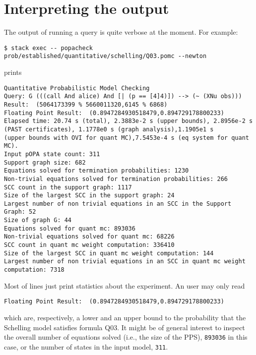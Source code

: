 \documentclass[9pt,a4paper]{article}
\begin{document}
\section{Interpreting the output}
\label{sec:output}
The output of running a query is quite verbose at the moment. For example: 
\begin{verbatim}
$ stack exec -- popacheck prob/established/quantitative/schelling/Q03.pomc --newton
\end{verbatim}
prints 
\begin{verbatim}
Quantitative Probabilistic Model Checking
Query: G (((call And alice) And [| (p == [4]4)]) --> (~ (XNu obs)))
Result:  (5064173399 % 5660011320,6145 % 6868)
Floating Point Result:  (0.8947284930518479,0.894729178800233)
Elapsed time: 20.74 s (total), 2.3883e-2 s (upper bounds), 2.8956e-2 s (PAST certificates), 1.1778e0 s (graph analysis),1.1905e1 s 
(upper bounds with OVI for quant MC),7.5453e-4 s (eq system for quant MC).
Input pOPA state count: 311
Support graph size: 682
Equations solved for termination probabilities: 1230
Non-trivial equations solved for termination probabilities: 266
SCC count in the support graph: 1117
Size of the largest SCC in the support graph: 24
Largest number of non trivial equations in an SCC in the Support Graph: 52
Size of graph G: 44
Equations solved for quant mc: 893036
Non-trivial equations solved for quant mc: 68226
SCC count in quant mc weight computation: 336410
Size of the largest SCC in quant mc weight computation: 144
Largest number of non trivial equations in an SCC in quant mc weight computation: 7318

\end{verbatim}
Most of lines just print statistics about the experiment. An user may only read
\begin{verbatim}
Floating Point Result:  (0.8947284930518479,0.894729178800233)
\end{verbatim}
which are, respectively, a lower and an upper bound to the probability that the Schelling model satisfies formula Q03. It might be of general interest to inspect the overall number of equations solved (i.e., the size of the PPS), \verb|893036| in this case, or the number of states in the input model, \verb|311|.
\end{document}
